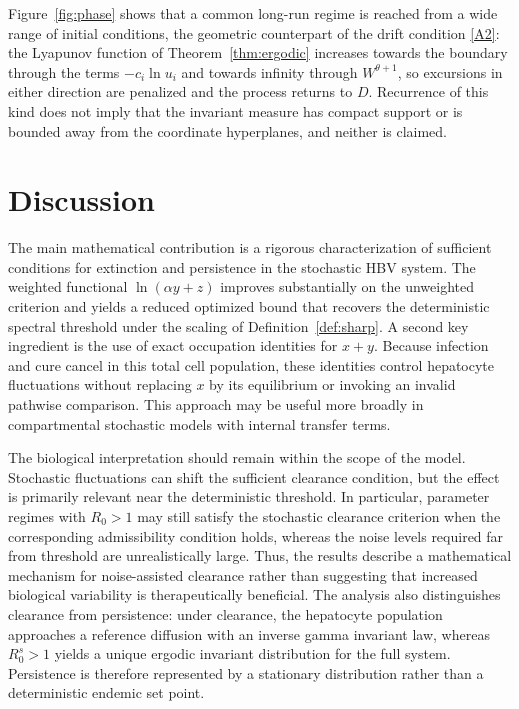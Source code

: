 \documentclass{article}
\newcommand{\Rz}{R_0}
\newcommand{\Rs}{R_0^{s}}
\begin{document}
Figure~\ref{fig:phase} shows that a common long-run regime is reached from a wide range of initial conditions, the geometric counterpart of the drift condition \eqref{A2}: the Lyapunov function of Theorem~\ref{thm:ergodic} increases towards the boundary through the terms $-c_i\ln u_i$ and towards infinity through $W^{\theta+1}$, so excursions in either direction are penalized and the process returns to $D$. Recurrence of this kind does not imply that the invariant measure has compact support or is bounded away from the coordinate hyperplanes, and neither is claimed.

\section{Discussion}\label{sec:discussion}

The main mathematical contribution is a rigorous characterization of sufficient conditions for extinction and persistence in the stochastic HBV system. The weighted functional $\ln(\alpha y+z)$ improves substantially on the unweighted criterion and yields a reduced optimized bound that recovers the deterministic spectral threshold under the scaling of Definition~\ref{def:sharp}. A second key ingredient is the use of exact occupation identities for $x+y$. Because infection and cure cancel in this total cell population, these identities control hepatocyte fluctuations without replacing $x$ by its equilibrium or invoking an invalid pathwise comparison. This approach may be useful more broadly in compartmental stochastic models with internal transfer terms.

The biological interpretation should remain within the scope of the model. Stochastic fluctuations can shift the sufficient clearance condition, but the effect is primarily relevant near the deterministic threshold. In particular, parameter regimes with $\Rz>1$ may still satisfy the stochastic clearance criterion when the corresponding admissibility condition holds, whereas the noise levels required far from threshold are unrealistically large. Thus, the results describe a mathematical mechanism for noise-assisted clearance rather than suggesting that increased biological variability is therapeutically beneficial. The analysis also distinguishes clearance from persistence: under clearance, the hepatocyte population approaches a reference diffusion with an inverse gamma invariant law, whereas $\Rs>1$ yields a unique ergodic invariant distribution for the full system. Persistence is therefore represented by a stationary distribution rather than a deterministic endemic set point.
\end{document}
